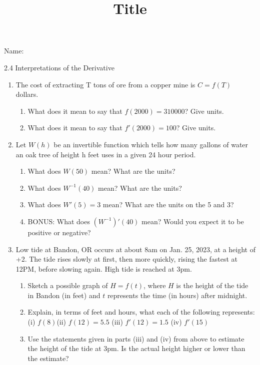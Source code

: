 \documentclass[12pt]{article}
\title{Title}
\begin{document}

 Name:
 \begin{center}\large{2.4 Interpretations of the Derivative}\end{center}

\begin{enumerate}
\item The cost of extracting T tons of ore from a copper mine is $C=f(T)$ dollars. 
	\begin{enumerate}
	\item What does it mean to say that $f(2000)=310000$? Give units.
		\vfill
	\item What does it mean to say that $f'(2000)=100$? Give units.
		\vfill
	\end{enumerate}
	
\item Let $W(h)$ be an invertible function which tells how many gallons of water an oak tree of height h feet uses in a given 24 hour period. 
	\begin{enumerate}
	\item What does $W\left(50\right)$ mean? What are the units?
	\vfill
	\item What does $W^{-1}\left(40\right)$ mean? What are the units?
		\vfill
	\item What does $W'\left(5\right)=3$ mean? What are the units on the 5 and 3?
		\vfill
	\item BONUS: What does $\left(W^{-1}\right)' \left(40\right)$ mean? Would you expect it to be positive or negative?
	\end{enumerate}
	
		\vfill
\item Low tide at Bandon, OR occurs at about 8am on Jan. 25, 2023, at a height of +2. The tide rises slowly at first, then more quickly, rising the fastest at 12PM, before slowing again. High tide is reached at 3pm.
	\begin{enumerate}
	\item Sketch a possible graph of $H = f(t)$, where $H$ is the height of the tide in Bandon (in feet) and $t$ represents the time (in hours) after midnight.\\
		\vfill
	
	\item Explain, in terms of feet and hours, what each of the following represents: \\
	(i) $f(8) $\hspace{5mm}(ii) $f(12)=5.5$ \hspace{5mm} (iii) $f'(12) = 1.5$\hspace{5mm} (iv) $f'(15)$ \\
		\vfill
	\item Use the statements given in parts (iii) and (iv) from above to estimate the height of the tide at 3pm. Is the actual height higher or lower than the estimate?
		\vfill
	\end{enumerate}
	
\end{enumerate}
\end{document}
